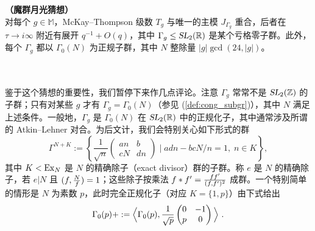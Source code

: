 \documentclass[11pt,a4paper,fontset=windows]{ctexart}
\numberwithin{equation}{section}
\newcommand{\SL}{\operatorname{\textsl{SL}}}      %
\newcommand{\RR}{\mathbb{R}}
\newcommand{\ZZ}{\mathbb{Z}}
\newcommand{\MM}{\mathbb{M}}
\def\t{\tau}
\newcommand{\tr}{\operatorname{Tr}}
\newcommand{\be}{\begin{equation}}
\newcommand{\ee}{\end{equation}}
\newcommand{\eq}[1]{(\ref{#1})}
\newcommand{\bem}{\begin{pmatrix}}
\newcommand{\eem}{\end{pmatrix}}
\begin{document}


{\conj \label{conj:conwa_norton}  {\bf（魔群月光猜想）}\\
对每个 $g\in \MM$，McKay–Thompson 级数 $T_g$ 与唯一的主模 $J_{\Gamma_g}$ 重合，后者在 $\t\to i\infty$ 附近有展开 $q^{-1}+O(q)$，其中 $\Gamma_g\leq\SL_2(\RR)$ 是某个亏格零子群。此外，每个 $\Gamma_g$ 都以 $\Gamma_0(N)$ 为正规子群，其中 $N$ 整除量 $|g|\gcd(24,|g|)$。
}


~\\~\\
鉴于这个猜想的重要性，我们暂停下来作几点评论。注意 $\Gamma_g$ 常常不是 $\SL_2(\ZZ)$ 的子群；只有对某些 $g$ 才有 $\Gamma_g= \Gamma_0(N)$（参见 \eq{def:cong_subgr}），其中 $N$ 满足上述条件。一般地，$\Gamma_g$ 是 $\Gamma_0(N)$ 在 $\SL_2(\RR)$ 中的正规化子，其中通常涉及所谓的 Atkin–Lehner 对合。为后文计，我们会特别关心如下形式的群
\be\label{eqn:groupAL}
\Gamma^{N+K} :=
	\left\{
		\frac1{\sqrt{n}}\begin{pmatrix}
		an&b\\cN&dn
		\end{pmatrix}
		\mid
		adn-bcN/n=1,\;
		 n \in K
	\right\},
\ee
其中 $K<{\rm Ex}_N$ 是 $N$ 的精确除子（exact divisor）群的子群。称 $e$ 是 $N$ 的精确除子，若 $e|N$ 且 $(f,{N\over f})=1$；这些除子按乘法 $f\ast f'  = {ff' \over (f,f')^2}$ 成群。一个特别简单的情形是 $N$ 为素数 $p$，此时完全正规化子（对应 $K=\{1,p\}$）由下式给出
\be
\Gamma_0(p)+:= \Big\langle \Gamma_0(p), {1\over \sqrt{p}} \bem 0&-1\\ p& 0\eem \Big\rangle ~. 
\ee

\end{document}
